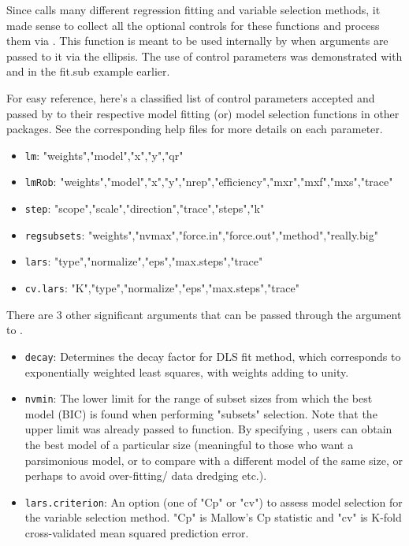 \documentclass[a4paper]{article}\usepackage[]{graphicx}\usepackage[]{color}
\begin{document}
Since  calls many different regression fitting and variable selection methods, it made sense to collect all the optional controls for these functions and process them via . This function is meant to be used internally by  when arguments are passed to it via the ellipsis. The use of control parameters was demonstrated with  and  in the fit.sub example earlier. 

For easy reference, here's a classified list of control parameters accepted and passed by  to their respective model fitting (or) model selection functions in other packages. See the corresponding help files for more details on each parameter.
\begin{itemize}
\item \verb"lm": "weights","model","x","y","qr"
\item \verb"lmRob": "weights","model","x","y","nrep","efficiency","mxr","mxf","mxs","trace"
\item \verb"step": "scope","scale","direction","trace","steps","k"
\item \verb"regsubsets": "weights","nvmax","force.in","force.out","method","really.big"
\item \verb"lars": "type","normalize","eps","max.steps","trace"
\item \verb"cv.lars": "K","type","normalize","eps","max.steps","trace"
\end{itemize}

There are 3 other significant arguments that can be passed through the  argument to .
\begin{itemize}
\item \verb"decay": Determines the decay factor for DLS fit method, which corresponds to exponentially weighted least squares, with weights adding to unity.
\item \verb"nvmin": The lower limit for the range of subset sizes from which the best model (BIC) is found when performing "subsets" selection. Note that the upper limit was already passed to  function. By specifying , users can obtain the best model of a particular size (meaningful to those who want a parsimonious model, or to compare with a different model of the same size, or perhaps to avoid over-fitting/ data dredging etc.).
\item \verb"lars.criterion": An option (one of "Cp" or "cv") to assess model selection for the  variable selection method. "Cp" is Mallow's Cp statistic and "cv" is K-fold cross-validated mean squared prediction error.
\end{itemize}
\end{document}
